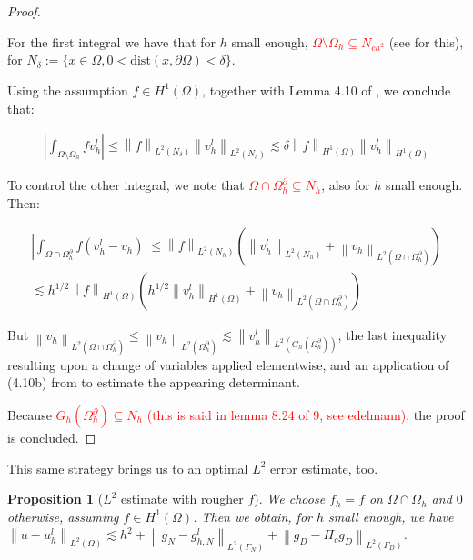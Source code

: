 \documentclass[english,a4paper,9pt,oneside]{scrbook}	%
\theoremstyle{break}
\newtheorem{prop}[equation]{Proposition}
\newenvironment{mproof}[1][\proofname]{%
  \begin{proof}[#1]$ $\par\nobreak\ignorespaces
}{%
  \end{proof}
}
\renewcommand*{\proofname}{Proof}
\theoremstyle{remark}
\newcommand{\norm}[1]{\left\lVert#1\right\rVert}
\begin{document}
\begin{appendices}
\begin{mproof}
For the first integral we have that for $h$ small enough, \textcolor{red}{$\Omega \setminus \Omega_h \subseteq N_{ch^2}$} (see \cite{tiihonen} for this), for $N_\delta :=\{ x \in \Omega, 0 <\text{dist}(x,\partial \Omega) < \delta\}$.

Using the assumption $f 	\in H^1(\Omega)$, together with Lemma 4.10 of \cite{elliott}, we conclude that:

\begin{align*}
\left | \int_{\Omega \setminus \Omega_h} f v_h^l \right | \leq \norm{f}_{L^2(N_\delta)} \norm{v_h^l}_{L^2(N_\delta)} \lesssim \delta \norm{f}_{H^1(\Omega)} \norm{v_h^l}_{H^1(\Omega)}
\end{align*} 

To control the other integral, we note that \textcolor{red}{$\Omega \cap \Omega_h^\partial \subseteq N_h$}, also for $h$ small enough. Then:

\begin{align*}
\left | \int_{\Omega \cap \Omega_h^\partial} f (v_h^l - v_h) \right | \leq \norm{f}_{L^2(N_h)}( \norm{v_h^l}_{L^2(N_h)} + \norm{v_h}_{L^2(\Omega \cap \Omega_h^\partial)})\\ \lesssim h^{1/2} \norm{f}_{H^1(\Omega)} ( h^{1/2}\norm{v_h^l}_{H^1(\Omega)}+ \norm{v_h}_{L^2(\Omega \cap \Omega_h^\partial)})
\end{align*} 

But $\norm{v_h}_{L^2(\Omega \cap \Omega_h^\partial)} \leq \norm{v_h}_{L^2(\Omega_h^\partial)} \lesssim \norm{v_h^l}_{L^2(G_h(\Omega_h^\partial))}$, the last inequality resulting upon a change of variables applied elementwise, and an application of (4.10b) from \cite{elliott} to estimate the appearing determinant.

Because \textcolor{red}{$G_h(\Omega_h^\partial)\subseteq N_h$ (this is said in lemma 8.24 of 9, see edelmann)}, the proof is concluded.

\end{mproof}

This same strategy brings us to an optimal $L^2$ error estimate, too.

\begin{prop}[$L^2$ estimate with rougher $f$]
\label{prop:rough_L2_est_ell}
We choose $f_h=f $ on $\Omega \cap \Omega_h$ and $0$ otherwise, assuming $f \in H^1(\Omega)$. Then we obtain, for $h$ small enough, we have $\norm{u-u_h^l}_{L^2(\Omega)}\lesssim h^{2} + \norm{g_N-g_{h,N}^l}_{L^2(\Gamma_N)} + \norm{g_D - \Pi_c g_D}_{L^2(\Gamma_D)}$.
\end{prop}


\end{appendices}
\end{document}
